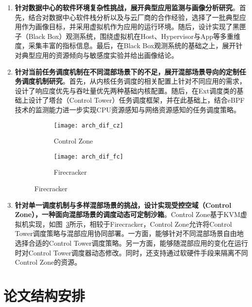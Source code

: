 \begin{enumerate}

    \item \textbf{针对数据中心的软件环境复杂性挑战，展开典型应用监测与画像分析研究}。首先，结合对数据中心软件栈分析以及与云厂商的合作经验，选择了一批典型应用作为画像目标，并采用虚拟机作为应用的运行环境。随后，设计实现了黑匣子（Black Box）观测系统，围绕虚拟机在Host、Hypervisor与App等多重维度，采集丰富的指标信息。最后，在Black Box观测系统的基础之上，展开针对典型应用的资源倾向与敏感度实验并给出画像结论。

    \item \textbf{针对当前任务调度机制在不同混部场景下的不足，展开混部场景导向的定制任务调度机制研究}。首先，从内核任务调度的相关配置上针对不同应用的需求，设计了响应度优先与吞吐量优先两种基础内核配置。随后，在Ext调度类的基础上设计了塔台（Control Tower）任务调度框架，并在此基础上，结合eBPF技术的监测能力进一步实现CPU资源感知与网络资源感知的任务调度策略。

\begin{figure}[H]
    \centering
    \begin{subfigure}[b]{0.4\textwidth}
        \texttt{[image: arch\_dif\_cz]}
        \caption{Control Zone}
        \label{fig:arch_dif_cz}
    \end{subfigure}
    \hspace{0.5cm}
    \begin{subfigure}[b]{0.4\textwidth}
        \texttt{[image: arch\_dif\_fc]}
        \caption{Firecracker}
        \label{fig:arch_dif_fc}
    \end{subfigure}
\label{fig:arch_dif}
\end{figure}

    \item \textbf{针对单一调度机制与多样混部场景的挑战，设计实现受控空域（Control Zone），一种面向混部场景的调度动态可定制沙箱}。Control Zone基于KVM虚拟机实现，如图~\ref{fig:arch_dif}所示，相较于Firecracker\citep{agache2020firecracker}，Control Zone允许将Control Tower调度策略与混部应用协同部署。一方面，能够针对不同混部场景自由地选择合适的Control Tower调度策略。另一方面，能够随混部应用的变化在运行时对Control Tower调度器动态修改。同时，还支持通过软硬件手段来隔离不同Control Zone的资源。

\end{enumerate}

\section{论文结构安排}

